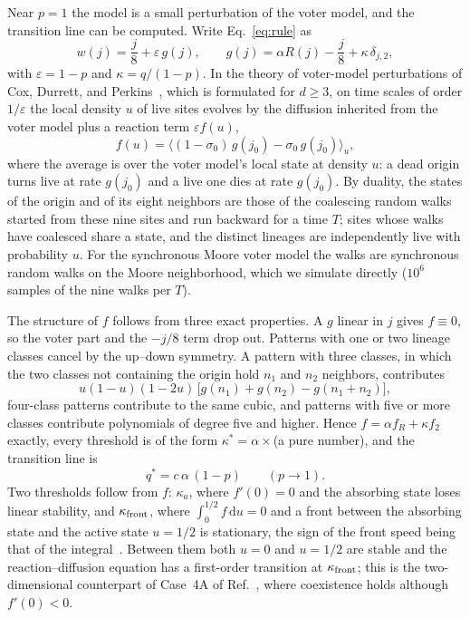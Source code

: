 \documentclass[pre,twocolumn,superscriptaddress,showpacs,floatfix]{revtex4-2}
\newcommand{\qs}{q^{*}}
\newcommand{\ds}{\mathrm{d}}
\begin{document}
Near $p = 1$ the model is a small perturbation of the voter model, and the transition line can be
computed. Write Eq.~\eqref{eq:rule} as
\begin{equation}
w(j) = \frac{j}{8} + \varepsilon\, g(j),\qquad
g(j) = \alpha R(j) - \frac{j}{8} + \kappa\,\delta_{j,2},
\label{eq:pert}
\end{equation}
with $\varepsilon = 1-p$ and $\kappa = q/(1-p)$. In the theory of voter-model perturbations of
Cox, Durrett, and Perkins~\cite{cox2013}, which is formulated for $d\ge3$, on time scales of
order $1/\varepsilon$ the local density $u$ of live sites
evolves by the diffusion inherited from the voter model plus a reaction term $\varepsilon f(u)$,
\begin{equation}
f(u) = \big\langle (1-\sigma_0)\,g(j_0) - \sigma_0\, g(j_0)\big\rangle_u ,
\label{eq:f}
\end{equation}
where the average is over the voter model's local state at density $u$: a dead origin turns live
at rate $g(j_0)$ and a live one dies at rate $g(j_0)$. By duality, the states of the origin and
of its eight neighbors are those of the coalescing random walks started from these nine sites
and run backward for a time $T$; sites whose walks have coalesced share a state, and the
distinct lineages are independently live with probability $u$. For the synchronous Moore voter
model the walks are synchronous random walks on the Moore neighborhood, which we simulate
directly ($10^6$ samples of the nine walks per $T$).

The structure of $f$ follows from three exact properties. A $g$ linear in $j$ gives $f\equiv 0$,
so the voter part and the $-j/8$ term drop out. Patterns with one or two lineage classes cancel
by the up--down symmetry. A pattern with three classes, in which the two classes not containing
the origin hold $n_1$ and $n_2$ neighbors, contributes
\begin{equation}
u(1-u)(1-2u)\,\big[g(n_1)+g(n_2)-g(n_1+n_2)\big],
\label{eq:three}
\end{equation}
four-class patterns contribute to the same cubic, and patterns with five or more classes
contribute polynomials of degree five and higher. Hence $f = \alpha f_R +
\kappa f_2$ exactly, every threshold is of the form $\kappa^* = \alpha\times$(a pure number),
and the transition line is
\begin{equation}
\qs = c\,\alpha\,(1-p)\qquad (p\to 1).
\label{eq:line}
\end{equation}
Two thresholds follow from $f$: $\kappa_a$, where $f'(0) = 0$ and the absorbing state loses linear
stability, and $\kappa_{\rm front}$, where $\int_0^{1/2} f\,\ds u = 0$ and a front between the
absorbing state and the active state $u = 1/2$ is stationary, the sign of the front speed being
that of the integral~\cite{durrett1994b,durrett2009}. Between them both $u = 0$ and
$u = 1/2$ are stable and the reaction--diffusion equation has a first-order transition at
$\kappa_{\rm front}$; this is the two-dimensional counterpart of Case~4A of
Ref.~\cite{cox2013}, where coexistence holds although $f'(0)<0$.
\end{document}
